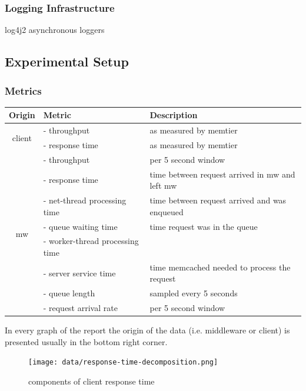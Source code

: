 \documentclass[11pt,a4paper]{article}
\newcommand\Tstrut{\rule{0pt}{2.6ex}}       %
\begin{document}
\subsubsection{Logging Infrastructure}

log4j2 asynchronous loggers


\subsection{Experimental Setup}

\subsubsection{Metrics}\label{measured-points}



\begin{tabular}{|c|l|l|}
	\hline 
	\textbf{Origin} & \textbf{Metric} & \textbf{Description} \Tstrut \\ 
	\hline 
	\multirow{2}{*}{client} & - throughput & as measured by memtier \Tstrut \\ 
	& - response time & as measured by memtier \\ 
	\hline 
	\multirow{8}{*}{mw} & - throughput & per 5 second window \Tstrut \\ 
	& - response time & time between request arrived in mw and left mw\\ 
	& - net-thread processing time & time between request arrived and was enqueued\\  
	& - queue waiting time & time request was in the queue \\ 
	& - worker-thread processing time &  \\ 
	& - server service time & time memcached needed to process the request\\  
	& - queue length & sampled every 5 seconds \\  
	& - request arrival rate & per 5 second window \\ 
	\hline 
\end{tabular} 

In every graph of the report the origin of the data (i.e. middleware or client) is presented usually in the bottom right corner.


\begin{figure}
	\centering
	\texttt{[image: data/response-time-decomposition.png]}
	\caption{components of client response time}
\end{figure}
\end{document}
